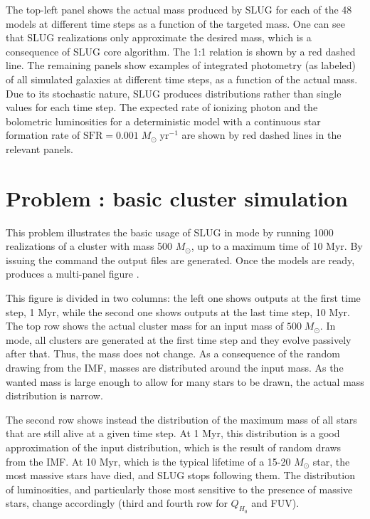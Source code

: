 \documentclass[letterpaper,10pt,english]{sphinxmanual}
\begin{document}
The top-left panel shows the actual mass produced by SLUG for each of the 48 models at different time steps as a
function of the targeted mass. One can see that SLUG realizations only approximate the desired mass, which is a consequence
of SLUG core algorithm. The 1:1 relation is shown by a red dashed line.
The remaining panels show examples of integrated photometry (as labeled) of all simulated galaxies
at different time steps, as a function of the actual mass. Due to its stochastic nature, SLUG produces
distributions rather than single values for each time step. The expected rate of ionizing
photon and the bolometric luminosities for a deterministic model with a
continuous star formation rate of \(\mathrm{SFR}=0.001\; M_\odot\;\mathrm{yr}^{-1}\) are shown
by red dashed lines in the relevant panels.


\section{Problem : basic cluster simulation}
\label{\detokenize{tests:problem-example-cluster-basic-cluster-simulation}}
This problem illustrates the basic usage of SLUG in  mode by running 1000 realizations of a cluster
with mass 500 \(M_\odot\), up to a maximum time of 10 Myr. By issuing the command
 the output files  are
generated. Once the models are ready,  produces a multi-panel
figure .

This figure is divided in two columns: the left one shows outputs at the first time step, 1 Myr, while
the second one shows outputs at the last time step, 10 Myr.  The top row shows the actual cluster mass for an
input mass of \(500\;M_\odot\).
In  mode, all clusters are generated at the first time step and they evolve
passively after that. Thus, the mass does not change. As a consequence of the
random drawing from the IMF, masses are distributed around the input mass.
As the wanted mass is large enough to allow for many stars to be drawn, the
actual mass distribution is narrow.

The second row shows instead the distribution of the maximum mass of all stars that are still
alive at a given time step. At 1 Myr, this distribution is a good approximation of the
input distribution, which is the result of random draws from the IMF. At 10 Myr, which is the
typical lifetime of a 15-20 \(M_\odot\) star, the most massive stars have died, and
SLUG stops following them. The distribution of luminosities, and particularly those
most sensitive to the presence of massive stars, change accordingly
(third and fourth row for \(Q_{H_0}\) and FUV).
\end{document}
